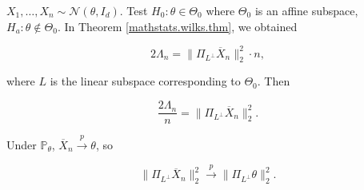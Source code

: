 \begin{example}

\(X_1, \ldots, X_n \sim \mathcal{N}(\theta, I_d)\). Test \(H_0: \theta \in \Theta_0\) where \(\Theta_0\) is an affine subspace, \(H_a: \theta \notin \Theta_0\). In Theorem \ref{mathstats.wilks.thm}, we obtained 

\[
2 \Lambda_n =  \lVert \Pi_{L^\perp} \overline{X}_n \rVert_2^2 \cdot n,
\]

where \(L\) is the linear subspace corresponding to \(\Theta_0\). Then

\[
\frac{2 \Lambda_n}{n} =   \lVert \Pi_{L^\perp} \overline{X}_n \rVert_2^2 .
\]

Under \(\mathbb{P}_\theta\), \(\overline{X}_n \xrightarrow{p} \theta\), so 

\[
  \lVert \Pi_{L^\perp} \overline{X}_n \rVert_2^2 \xrightarrow{p}   \lVert \Pi_{L^\perp} \theta \rVert_2^2 .
\]

\end{example}

